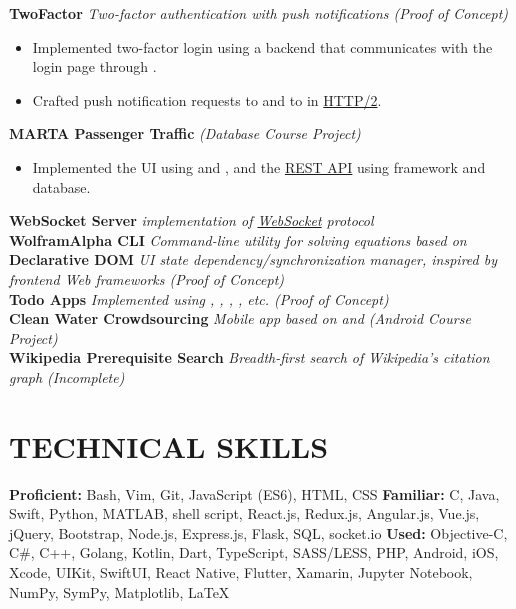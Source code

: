 \documentclass[11pt]{article}
\begin{document}
\vspace{0.5em}
%
\textbf{TwoFactor} \enspace \textit{Two-factor authentication with push notifications (Proof of Concept)}
\begin{itemize}[leftmargin=15pt, noitemsep, topsep=0pt]
\item Implemented two-factor login using a \underline{} backend that communicates with the login page through \underline{}.
\item Crafted push notification requests to \underline{} and to \underline{} in \underline{HTTP/2}.
\end{itemize}
\vspace{0.5em}
%
\textbf{MARTA Passenger Traffic} \enspace \textit{(Database Course Project)}
\begin{itemize}[leftmargin=15pt, noitemsep, topsep=0pt]
\item Implemented the UI using \underline{} and \underline{}, and the \underline{REST API} using \underline{} framework and \underline{} database.
\end{itemize}
\vspace{0.5em}
%
\textbf{WebSocket Server}  \enspace \textit{\underline{} implementation of \underline{WebSocket} protocol}\\
\textbf{WolframAlpha CLI} \enspace \textit{Command-line utility for solving equations based on \underline{}}\\
\textbf{Declarative DOM} \enspace \textit{UI state dependency/synchronization manager, inspired by frontend Web frameworks (Proof of Concept)}\\
\textbf{Todo Apps} \enspace \textit{Implemented using \underline{}, \underline{}, \underline{}, \underline{}, etc. (Proof of Concept)}\\
\textbf{Clean Water Crowdsourcing}	\enspace \textit{Mobile app based on \underline{} and \underline{} (Android Course Project)}\\
\textbf{Wikipedia Prerequisite Search} \enspace \textit{Breadth-first search of Wikipedia's citation graph (Incomplete)}
\vspace{-0.5em}

\section*{TECHNICAL SKILLS}
\textbf{Proficient:} Bash, Vim, Git, JavaScript (ES6), HTML, CSS  \enspace\textbf{Familiar:} C, Java, Swift, Python, MATLAB, shell script, React.js, Redux.js, Angular.js, Vue.js, jQuery, Bootstrap, Node.js, Express.js, Flask, SQL, socket.io \enspace\textbf{Used:} Objective-C, C\#, C++, Golang, Kotlin, Dart, TypeScript, SASS/LESS, PHP, Android, iOS, Xcode, UIKit, SwiftUI, React Native, Flutter, Xamarin, Jupyter Notebook, NumPy, SymPy, Matplotlib, LaTeX
\end{document}
